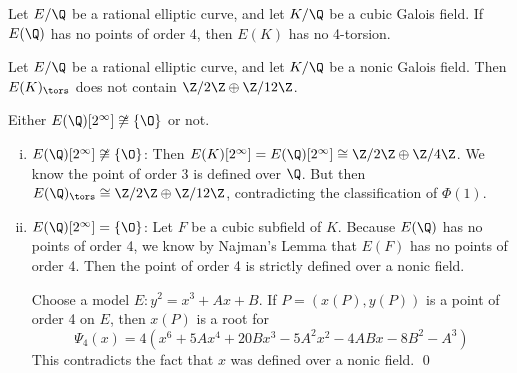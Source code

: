 \begin{frame}[plain]
\footnotesize
\begin{lem}[Najman, 2015]
Let $E/\Q$ be a rational elliptic curve, and let $K/\Q$ be a cubic Galois field. If $E(\Q)$ has no points of order 4, then $E(K)$ has no 4-torsion. 
\end{lem}

\begin{lem}
Let $E/\Q$ be a rational elliptic curve, and let $K/\Q$ be a nonic Galois field. Then $E(K)_\tors$ does not contain $\Z/2\Z \oplus \Z/12\Z$.
\end{lem}

\pf Either $E(\Q)[2^\infty] \not\cong \{ \O \}$ or not.
	\begin{enumerate}[(i)] \footnotesize
	\item $E(\Q)[2^\infty] \not\cong \{ \O \}$: Then $E(K)[2^\infty]= E(\Q)[2^\infty] \cong \Z/2\Z \oplus \Z/4\Z$. We know the point of order 3 is defined over $\Q$. But then $E(\Q)_\tors \cong \Z/2\Z \oplus \Z/12\Z$, contradicting the classification of $\Phi(1)$. 
	\item $E(\Q)[2^\infty]= \{ \O \}$: Let $F$ be a cubic subfield of $K$. Because $E(\Q)$ has no points of order 4, we know by Najman's Lemma that $E(F)$ has no points of order 4. Then the point of order 4 is strictly defined over a nonic field.\pspace
	
	Choose a model $E: y^2= x^3 + Ax + B$. If $P= (x(P), y(P))$ is a point of order 4 on $E$, then $x(P)$ is a root for 
		\[
		\Psi_4(x)= 4( x^6 + 5Ax^4 + 20Bx^3 - 5A^2x^2 - 4ABx - 8B^2 - A^3)
		\]
	This contradicts the fact that $x$ was defined over a nonic field. \hfill \qed
	\end{enumerate}
\end{frame}






